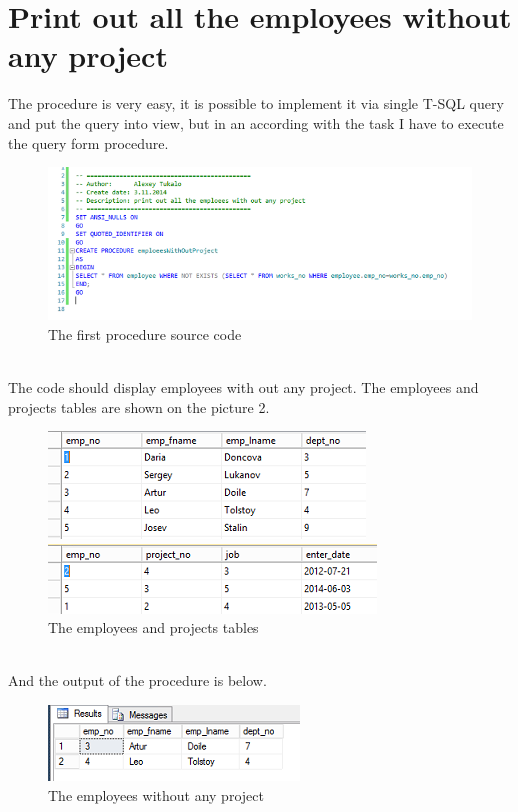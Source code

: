 \documentclass[english]{article}
\begin{document}
\section{Print out  all the employees  without any project}
The procedure is very easy, it is possible to implement it via single T-SQL query and put the query into view, but in an according with the task I have to execute the query form procedure.
\begin{figure}[hb]
\centerline{\includegraphics[scale=.9]{ProcedureSQL/firstProcedureSource}}
\caption{The first procedure source code}
\end{figure}\\
The code should display employees with out any project. The employees and projects tables are shown on the picture 2.
\begin{figure}[hb]
\centerline{\includegraphics{ProcedureSQL/emploee}}\vspace{0.1in}
\centerline{\includegraphics{ProcedureSQL/projects}}
\caption{The employees and projects tables}
\end{figure}\\
And the output of the procedure is below.
\begin{figure}[hb]
\centerline{\includegraphics{ProcedureSQL/output1}}
\caption{The employees  without any project}
\end{figure}
\end{document}
